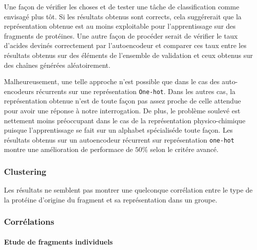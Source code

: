 \documentclass[a4paper, 11pt, onecolumn]{article}
\begin{document}
Une façon de vérifier les
choses et de tester une tâche de classification comme envisagé plus tôt. Si
les résultats obtenus sont corrects, cela suggérerait que la représentation
obtenue est au moins exploitable pour l'apprentissage sur des fragments de
protéines. Une autre façon de procéder serait de vérifier le taux d'acides
devinés correctement par l'autoencodeur et comparer ces taux entre les résultats
obtenus sur des éléments de l'ensemble de validation et ceux obtenus sur des
chaînes générées aléatoirement.

Malheureusement, une telle approche n'est possible que dans le cas des
auto-encodeurs récurrents sur une représentation \texttt{One-hot}. Dans les
autres cas, la représentation obtenue n'est de toute façon pas assez proche de
celle attendue pour avoir une réponse à notre interrogation. De plus, le
problème soulevé est nettement moins préoccupant dans le cas de la
représentation physico-chimique puisque l'apprentissage se fait sur un alphabet
\og spécialisé\fg de toute façon. Les résultats obtenus sur un autoencodeur
récurrent sur représentation \texttt{one-hot} montre une amélioration de
performace de $50\%$ selon le critére avancé.

\subsubsection{Clustering}

Les résultats ne semblent pas montrer une quelconque corrélation entre le type
de la protéine d'origine du fragment et sa représentation dans un groupe.

\subsubsection{Corrélations}

\paragraph{Etude de fragments individuels}
\end{document}
